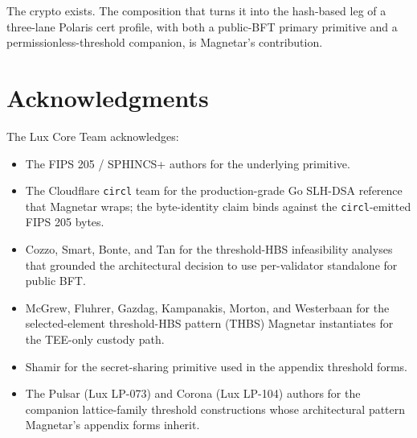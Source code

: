 The crypto exists. The composition that turns it into the
hash-based leg of a three-lane Polaris cert profile, with both a
public-BFT primary primitive and a permissionless-threshold
companion, is Magnetar's contribution.

\section*{Acknowledgments}

The Lux Core Team acknowledges:
\begin{itemize}[nosep,leftmargin=2em]
  \item The FIPS 205 / SPHINCS+ authors \cite{sphincs,fips205}
        for the underlying primitive.
  \item The Cloudflare \texttt{circl} team \cite{circl} for the
        production-grade Go SLH-DSA reference that Magnetar
        wraps; the byte-identity claim binds against the
        \texttt{circl}-emitted FIPS 205 bytes.
  \item Cozzo, Smart, Bonte, and Tan for the threshold-HBS
        infeasibility analyses that grounded the architectural
        decision to use per-validator standalone for public BFT.
  \item McGrew, Fluhrer, Gazdag, Kampanakis, Morton, and
        Westerbaan for the selected-element threshold-HBS
        pattern (THBS) Magnetar instantiates for the TEE-only
        custody path.
  \item Shamir \cite{shamir1979} for the secret-sharing
        primitive used in the appendix threshold forms.
  \item The Pulsar (Lux LP-073) and Corona (Lux LP-104) authors
        for the companion lattice-family threshold constructions
        whose architectural pattern Magnetar's appendix forms
        inherit.
\end{itemize}
